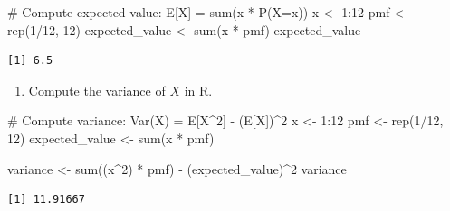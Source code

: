 \documentclass[
]{article}
\newenvironment{Shaded}{\begin{snugshade}}{\end{snugshade}}
\newcommand{\CommentTok}[1]{\textcolor[rgb]{0.37,0.37,0.37}{#1}}
\newcommand{\DecValTok}[1]{\textcolor[rgb]{0.68,0.00,0.00}{#1}}
\newcommand{\FunctionTok}[1]{\textcolor[rgb]{0.28,0.35,0.67}{#1}}
\newcommand{\NormalTok}[1]{\textcolor[rgb]{0.00,0.23,0.31}{#1}}
\newcommand{\OtherTok}[1]{\textcolor[rgb]{0.00,0.23,0.31}{#1}}
\newcommand{\SpecialCharTok}[1]{\textcolor[rgb]{0.37,0.37,0.37}{#1}}
\providecommand{\tightlist}{%
  \setlength{\itemsep}{0pt}\setlength{\parskip}{0pt}}
\begin{document}
\begin{tcolorbox}[enhanced jigsaw, arc=.35mm, bottomrule=.15mm, breakable, colback=white, colframe=quarto-callout-tip-color-frame, left=2mm, leftrule=.75mm, opacityback=0, rightrule=.15mm, toprule=.15mm]

\begin{Shaded}
\begin{Highlighting}[]
\CommentTok{\# Compute expected value: E[X] = sum(x * P(X=x))}
\NormalTok{x }\OtherTok{\textless{}{-}} \DecValTok{1}\SpecialCharTok{:}\DecValTok{12}
\NormalTok{pmf }\OtherTok{\textless{}{-}} \FunctionTok{rep}\NormalTok{(}\DecValTok{1}\SpecialCharTok{/}\DecValTok{12}\NormalTok{, }\DecValTok{12}\NormalTok{)}
\NormalTok{expected\_value }\OtherTok{\textless{}{-}} \FunctionTok{sum}\NormalTok{(x }\SpecialCharTok{*}\NormalTok{ pmf)}
\NormalTok{expected\_value}
\end{Highlighting}
\end{Shaded}

\begin{verbatim}
[1] 6.5
\end{verbatim}

\end{tcolorbox}

\begin{enumerate}
\def\labelenumi{(\alph{enumi})}
\setcounter{enumi}{3}
\tightlist
\item
  Compute the variance of \(X\) in R.
\end{enumerate}

\begin{tcolorbox}[enhanced jigsaw, arc=.35mm, bottomrule=.15mm, breakable, colback=white, colframe=quarto-callout-tip-color-frame, left=2mm, leftrule=.75mm, opacityback=0, rightrule=.15mm, toprule=.15mm]

\begin{Shaded}
\begin{Highlighting}[]
\CommentTok{\# Compute variance: Var(X) = E[X\^{}2] {-} (E[X])\^{}2}
\NormalTok{x }\OtherTok{\textless{}{-}} \DecValTok{1}\SpecialCharTok{:}\DecValTok{12}
\NormalTok{pmf }\OtherTok{\textless{}{-}} \FunctionTok{rep}\NormalTok{(}\DecValTok{1}\SpecialCharTok{/}\DecValTok{12}\NormalTok{, }\DecValTok{12}\NormalTok{)}
\NormalTok{expected\_value }\OtherTok{\textless{}{-}} \FunctionTok{sum}\NormalTok{(x }\SpecialCharTok{*}\NormalTok{ pmf)}

\NormalTok{variance }\OtherTok{\textless{}{-}} \FunctionTok{sum}\NormalTok{((x}\SpecialCharTok{\^{}}\DecValTok{2}\NormalTok{) }\SpecialCharTok{*}\NormalTok{ pmf) }\SpecialCharTok{{-}}\NormalTok{ (expected\_value)}\SpecialCharTok{\^{}}\DecValTok{2}
\NormalTok{variance}
\end{Highlighting}
\end{Shaded}

\begin{verbatim}
[1] 11.91667
\end{verbatim}

\end{tcolorbox}
\end{document}
